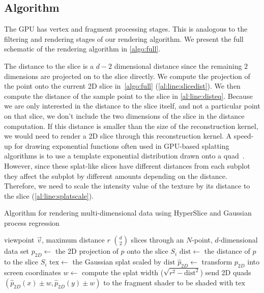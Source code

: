 \subsection{Algorithm}
\label{sec:algorithm}

The GPU has vertex and fragment processing stages.  This is analogous
to the filtering and rendering stages of our rendering algorithm.
We present the full schematic of the rendering algorithm in \autoref{algo:full}.

The distance to the slice is a $d-2$ dimensional distance since the remaining
$2$ dimensions are projected on to the slice directly.
We compute the projection of the point onto the current 2D 
slice in~\autoref{algo:full} (\autoref{al:line:slicedist}).
We then compute the distance of the sample point to the slice in 
\autoref{al:line:disteq}.
Because we are only interested in the distance to the slice itself, and not
a particular point on that slice, we don't include the two dimensions
of the slice in the distance computation.  
If this distance is smaller
than the size of the reconstruction kernel, we would need to render a
2D slice through this reconstruction kernel. 
A speed-up for drawing exponential functions often used
in GPU-based splatting algorithms is to use a template exponential distribution
drawn onto a quad~\cite{Mueller:1998}.
However, since these splat-like slices have different distances from each subplot they affect
the subplot by different amounts depending on the distance.  Therefore, we 
need to scale the intensity
value of the texture by its distance to the 
slice (\autoref{al:line:splatscale}).

\begin{algorithm}
  \caption{Algorithm for rendering multi-dimensional data using HyperSlice and Gaussian process regression}
  \label{algo:full}
  \begin{algorithmic}
  \Require viewpoint $\vec{v}$, maximum distance $r$
  \Ensure ${d \choose 2}$ slices through an $N$-point, $d$-dimensional data set
   
      \State $p_{2D} \gets$ the 2D projection of $p$ onto the slice $S_i$\label{al:line:slicedist}\;
      \State $\mathrm{dist} \gets$ the distance of $p$ to the slice $S_i$\label{al:line:disteq}\;
        \label{al:line:filterif}
        \State $\mathrm{tex} \gets$ the Gaussian splat scaled by $\mathrm{dist}$\label{al:line:splatscale}\;
        \State $\hat{p}_{2D} \gets$ transform $p_{2D}$ into screen coordinates\label{al:line:screenpoint}\;
        \State $w \gets$ compute the splat width ($\sqrt{r^2-\mathrm{dist}^2}$)\label{al:line:splatsize}\;
        \State send 2D quads $(\hat{p}_{2D}(x) \pm w, \hat{p}_{2D}(y) \pm w)$ to the 
          fragment shader to be shaded with $\mathrm{tex}$\;
      \EndIf
    \EndFor
  \EndFor
  \end{algorithmic}
\end{algorithm}

